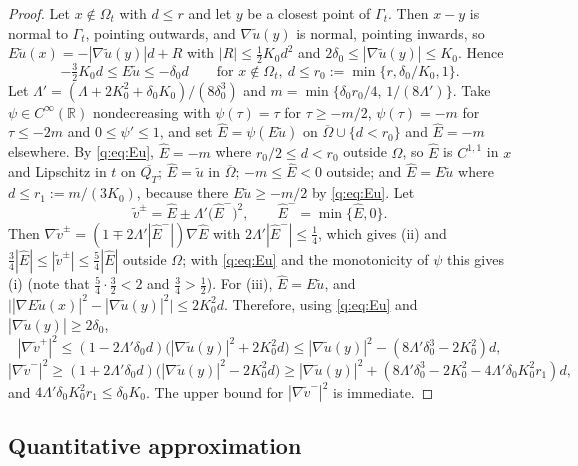 \documentclass[11pt]{amsart}
\theoremstyle{definition}
\theoremstyle{remark}
\newcommand{\R}{\mathbb{R}}
\begin{document}
\begin{proof}
Let $x\notin\Omega_t$ with $d\le r$ and let $y$ be a closest point of $\Gamma_t$. Then
$x-y$ is normal to $\Gamma_t$, pointing outwards, and $\nabla\tilde u(y)$ is normal, pointing
inwards, so $E\tilde u(x)=-|\nabla\tilde u(y)|d+R$ with $|R|\le\frac12K_0d^2$ and
$2\delta_0\le|\nabla\tilde u(y)|\le K_0$. Hence
\begin{equation}\label{q:eq:Eu}
-\tfrac32K_0d\le E\tilde u\le-\delta_0d\qquad\text{for }x\notin\Omega_t,\ d\le r_0:=\min\{r,\delta_0/K_0,1\}.
\end{equation}
Let $\Lambda'=(\Lambda+2K_0^2+\delta_0K_0)/(8\delta_0^3)$ and
$m=\min\{\delta_0r_0/4,\,1/(8\Lambda')\}$. Take $\psi\in C^\infty(\R)$ nondecreasing with
$\psi(\tau)=\tau$ for $\tau\ge-m/2$, $\psi(\tau)=-m$ for $\tau\le-2m$ and $0\le\psi'\le1$, and set
$\hat E=\psi(E\tilde u)$ on $\overline\Omega\cup\{d<r_0\}$ and $\hat E=-m$ elsewhere. By
\eqref{q:eq:Eu}, $\hat E=-m$ where $r_0/2\le d<r_0$ outside $\Omega$, so $\hat E$ is $C^{1,1}$
in $x$ and Lipschitz in $t$ on $\overline{Q_T}$; $\hat E=\tilde u$ in $\overline\Omega$; $-m\le\hat E<0$
outside; and $\hat E=E\tilde u$ where $d\le r_1:=m/(3K_0)$, because there
$E\tilde u\ge-m/2$ by \eqref{q:eq:Eu}. Let
\[
\tilde v^\pm=\hat E\pm\Lambda'\big(\hat E^-\big)^2,\qquad \hat E^-=\min\{\hat E,0\}.
\]
Then $\nabla\tilde v^\pm=(1\mp2\Lambda'|\hat E^-|)\nabla\hat E$ with
$2\Lambda'|\hat E^-|\le\frac14$, which gives (ii) and
$\frac34|\hat E|\le|\tilde v^\pm|\le\frac54|\hat E|$ outside $\Omega$; with \eqref{q:eq:Eu} and
the monotonicity of $\psi$ this gives (i) (note that $\frac54\cdot\frac32<2$ and
$\frac34>\frac12$). For (iii), $\hat E=E\tilde u$, and
$\big||\nabla E\tilde u(x)|^2-|\nabla\tilde u(y)|^2\big|\le2K_0^2d$. Therefore, using
\eqref{q:eq:Eu} and $|\nabla\tilde u(y)|\ge2\delta_0$,
\[
|\nabla\tilde v^+|^2\le(1-2\Lambda'\delta_0d)\big(|\nabla\tilde u(y)|^2+2K_0^2d\big)
\le|\nabla\tilde u(y)|^2-(8\Lambda'\delta_0^3-2K_0^2)d,
\]
\[
|\nabla\tilde v^-|^2\ge(1+2\Lambda'\delta_0d)\big(|\nabla\tilde u(y)|^2-2K_0^2d\big)
\ge|\nabla\tilde u(y)|^2+(8\Lambda'\delta_0^3-2K_0^2-4\Lambda'\delta_0K_0^2r_1)d,
\]
and $4\Lambda'\delta_0K_0^2r_1\le\delta_0K_0$. The upper bound for $|\nabla\tilde v^-|^2$ is
immediate.
\end{proof}

\subsection{Quantitative approximation}
\end{document}
